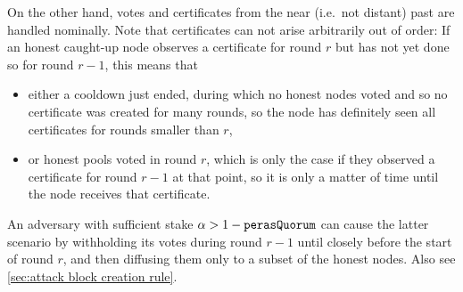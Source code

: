 On the other hand, votes and certificates from the near (i.e.\ not distant) past are handled nominally.
Note that certificates can not arise arbitrarily out of order:
If an honest caught-up node observes a certificate for round $r$ but has not yet done so for round $r-1$, this means that
\begin{itemize}
\item
  either a cooldown just ended, during which no honest nodes voted and so no certificate was created for many rounds, so the node has definitely seen all certificates for rounds smaller than $r$,
\item
  or honest pools voted in round $r$, which is only the case if they observed a certificate for round $r-1$ at that point, so it is only a matter of time until the node receives that certificate.
\end{itemize}
An adversary with sufficient stake $\alpha > 1-\mathtt{perasQuorum}$ can cause the latter scenario by withholding its votes during round $r-1$ until closely before the start of round $r$, and then diffusing them only to a subset of the honest nodes.
Also see \cref{sec:attack block creation rule}.

